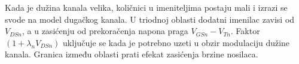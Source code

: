 Kada je dužina kanala velika, količnici u imeniteljima postaju mali i izrazi se svode na model dugačkog kanala. U triodnoj oblasti dodatni imenilac zavisi od $V_{DSn}$, a u zasićenju od prekoračenja napona praga $V_{GSn}-V_{Tn}$. Faktor $(1+\lambda_nV_{DSn})$ uključuje se kada je potrebno uzeti u obzir modulaciju dužine kanala. Granica između oblasti prati efekat zasićenja brzine nosilaca.
